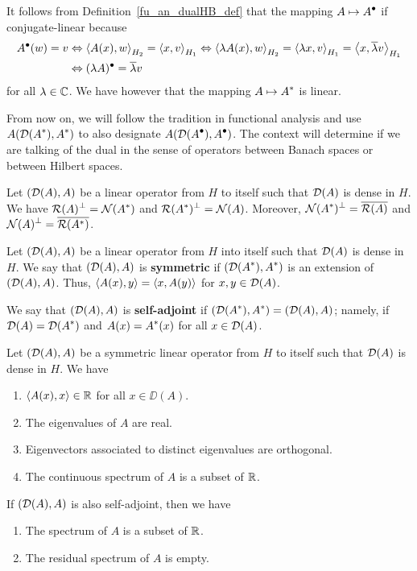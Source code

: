 It follows from Definition~\ref{fu_an_dualHB_def} that
the mapping $\displaystyle A \mapsto A^\bullet$ if conjugate-linear
because
\begin{align*}
A^\bullet(w) = v
& \Leftrightarrow \left\langle{A(x)} , {w}\right\rangle_{H_2} = \left\langle{x} , {v}\right\rangle_{H_1}
\Leftrightarrow \left\langle{\lambda A(x)} , {w}\right\rangle_{H_2} = \left\langle{\lambda x} , {v}\right\rangle_{H_1}
= \left\langle{x} , {\overline{\lambda} v}\right\rangle_{H_1} \\
& \Leftrightarrow (\lambda A)^\bullet = \overline{\lambda} v
\end{align*}
for all $\lambda \in \mathbb{C}$.  We have
however that the mapping $\displaystyle A \mapsto A^\ast$ is linear.

From now on, we will follow the tradition in functional analysis and
use $\displaystyle A (\mathcal{D}(A^\ast),A^\ast)$ to also designate
$\displaystyle A (\mathcal{D}(A^\bullet),A^\bullet)$.  The context will determine if we are
talking of the dual in the sense of operators between Banach spaces or
between Hilbert spaces.

\begin{theorem} \label{fu_an_RIOrth}
Let $(\mathcal{D}(A),A)$ be a linear operator from $H$ to itself
such that $\mathcal{D}(A)$ is dense in $H$.  We have
$\displaystyle \mathcal{R}(A)^\perp = \mathcal{N}(A^\ast)$ and
$\displaystyle \mathcal{R}(A^\ast)^\perp = \mathcal{N}(A)$.
Moreover, $\displaystyle \mathcal{N}(A^\ast)^\perp = \overline{\mathcal{R}(A)}$ and
$\displaystyle \mathcal{N}(A)^\perp = \overline{\mathcal{R}(A^\ast)}$.
\end{theorem}

\begin{defn}
Let $(\mathcal{D}(A),A)$ be a linear operator from $H$ into itself
such that $\mathcal{D}(A)$ is dense in $H$.  We say that $(\mathcal{D}(A),A)$ is
{\bfseries symmetric}
if $\displaystyle (\mathcal{D}(A^\ast),A^\ast)$ is an extension of $(\mathcal{D}(A),A)$.  Thus,
$\displaystyle \left\langle{A(x)} , {y}\right\rangle = \left\langle{x} , {A(y)}\right\rangle$ for $x,y \in \mathcal{D}(A)$.

We say that $(\mathcal{D}(A),A)$ is
{\bfseries self-adjoint} if
$\displaystyle (\mathcal{D}(A^\ast),A^\ast) = (\mathcal{D}(A),A)$; namely, if
$\displaystyle \mathcal{D}(A)=\mathcal{D}(A^\ast)$ and
$\displaystyle A(x)=A^\ast(x)$ for all $x \in \mathcal{D}(A)$.
\end{defn}

\begin{theorem}
Let $(\mathcal{D}(A),A)$ be a symmetric linear operator from $H$
to itself such that $\mathcal{D}(A)$ is dense in $H$.  We have
\begin{enumerate}
\item $\left\langle{A(x)} , {x}\right\rangle \in \mathbb{R}$ for all $x \in \DD(A)$.
\item The eigenvalues of $A$ are real.
\item Eigenvectors associated to distinct eigenvalues are orthogonal.
\item The continuous spectrum of $A$ is a subset of $\mathbb{R}$.
\end{enumerate}
If $(\mathcal{D}(A),A)$ is also self-adjoint, then we have
\begin{enumerate}
\item The spectrum of $A$ is a subset of $\mathbb{R}$.
\item The residual spectrum of $A$ is empty.
\end{enumerate}
\end{theorem}

